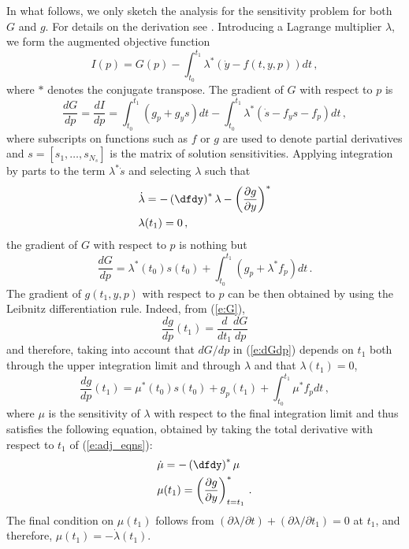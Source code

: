 In what follows, we only sketch the analysis for the 
sensitivity problem for both $G$ and $g$.
For details on the derivation see \cite{CLPS:03}.
Introducing a Lagrange multiplier $\lambda$, we form the augmented
objective function
\begin{equation}
I(p) = G(p) - \int_{t_0}^{t_1} \lambda^* 
\left( {\dot y} - f(t,y,p)\right) dt \, ,
\end{equation}
where $*$ denotes the conjugate transpose. The gradient of $G$ with respect
to $p$ is
\begin{equation}
  \frac{dG}{dp} = \frac{dI}{dp} 
=\int_{t_0}^{t_1}(g_p + g_y s)dt - \int_{t_0}^{t_1} 
\lambda^* \left( {\dot s} - f_y s - f_p \right)dt \, ,
\end{equation}
where subscripts on functions such as $f$ or $g$ are used to denote partial 
derivatives and $s = [s_1,\ldots,s_{N_s}]$ is the matrix of solution sensitivities.
Applying integration by parts to the term $\lambda^* {\dot s}$ and selecting
$\lambda$ such that
\begin{equation}\label{e:adj_eqns}
\begin{split}
&{\dot\lambda} = -\left( \dfdy \right)^* \lambda - 
\left( \frac{\partial g}{\partial y} \right)^* \\
&\lambda(t_1) = 0 \, ,
\end{split}
\end{equation}
the gradient of $G$ with respect to $p$ is nothing but
\begin{equation}\label{e:dGdp}
\frac{dG}{dp} = \lambda^*(t_0) s(t_0) + 
\int_{t_0}^{t_1} \left( g_p + \lambda^* f_p \right) dt \, .
\end{equation}
The gradient of $g(t_1,y,p)$ with respect to $p$ can be then obtained
by using the Leibnitz differentiation rule. Indeed, from (\ref{e:G}),
\begin{equation*}
\frac{dg}{dp}(t_1) = \frac{d}{dt_1}\frac{dG}{dp}
\end{equation*}
and therefore, taking into account that $dG/dp$ in (\ref{e:dGdp}) depends on $t_1$
both through the upper integration limit and through $\lambda$ and that
$\lambda(t_1) = 0$, 
\begin{equation}\label{e:dgdp}
\frac{dg}{dp}(t_1) = \mu^*(t_0) s(t_0) + g_p(t_1) +
\int_{t_0}^{t_1} \mu^* f_p dt \, ,
\end{equation}
where $\mu$ is the sensitivity of $\lambda$ with respect to the final integration 
limit and thus satisfies the following equation, obtained by taking the total
derivative with respect to $t_1$ of (\ref{e:adj_eqns}):
\begin{equation}\label{e:adj1_eqns}
\begin{split}
&{\dot\mu} = -\left( \dfdy \right)^* \mu \\ 
&\mu(t_1) = \left( \frac{\partial g}{\partial y} \right)^*_{t=t_1} \, .
\end{split}
\end{equation}
The final condition on $\mu(t_1)$ follows from 
$(\partial\lambda/\partial t) + (\partial\lambda/\partial t_1) = 0$ at $t_1$, and
therefore, $\mu(t_1) = -{\dot\lambda}(t_1)$. 

